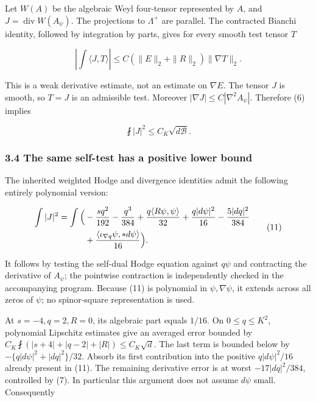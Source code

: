 \documentclass[
  10pt,
]{article}
\begin{document}
Let \(W(A)\) be the algebraic Weyl four-tensor represented by \(A\), and
\(J=\operatorname{div}W(A_\psi)\). The projections to \(\Lambda^+\) are
parallel. The contracted Bianchi identity, followed by integration by
parts, gives for every smooth test tensor \(T\)

\[
 \left|\int\langle J,T\rangle\right|
 \le C\left(\|E\|_2+\|R\|_2\right)\|\nabla T\|_2.      \tag{9}
\]

This is a weak derivative estimate, not an estimate on \(\nabla E\). The
tensor \(J\) is smooth, so \(T=J\) is an admissible test. Moreover
\(|\nabla J|\le C|\nabla^2A_\psi|\). Therefore (6) implies

\[
                 \fint|J|^2\le C_K\sqrt{d\mathcal B}.    \tag{10}
\]

\hypertarget{the-same-self-test-has-a-positive-lower-bound}{%
\subsubsection{3.4 The same self-test has a positive lower
bound}\label{the-same-self-test-has-a-positive-lower-bound}}

The inherited weighted Hodge and divergence identities admit the
following entirely polynomial version:

\[
\begin{aligned}
 \int|J|^2=\int\Big(&-{s q^2\over192}-{q^3\over384}
       +{q\langle R\psi,\psi\rangle\over32}
       +{q|d\psi|^2\over16}-{5|dq|^2\over384}\\
       &+{\langle\iota_{\nabla q}\psi,*d\psi\rangle\over16}
                           \Big).                         
\end{aligned}\tag{11}
\]

It follows by testing the self-dual Hodge equation against \(q\psi\) and
contracting the derivative of \(A_\psi\); the pointwise contraction is
independently checked in the accompanying program. Because (11) is
polynomial in \(\psi,\nabla\psi\), it extends across all zeros of
\(\psi\); no spinor-square representation is used.

At \(s=-4,q=2,R=0\), its algebraic part equals \(1/16\). On
\(0\le q\le K^2\), polynomial Lipschitz estimates give an averaged error
bounded by \(C_K\fint(|s+4|+|q-2|+|R|)\le C_K\sqrt d\). The last term is
bounded below by \(-\{q|d\psi|^2+|dq|^2\}/32\). Absorb its first
contribution into the positive \(q|d\psi|^2/16\) already present in
(11). The remaining derivative error is at worst \(-17|dq|^2/384\),
controlled by (7). In particular this argument does not assume \(d\psi\)
small. Consequently
\end{document}
